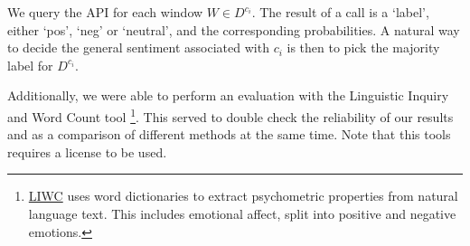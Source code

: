 We query the API for each window $W \in D^{c_i}$. The result of a call is a `label', either `pos', `neg' or `neutral', and the corresponding probabilities. A natural way to decide the general sentiment associated with $c_i$ is then to pick the majority label for $D^{c_i}$.

Additionally, we were able to perform an evaluation with the Linguistic Inquiry and Word Count tool \cite{liwc2015} \footnote{\href{https://liwc.wpengine.com/}{LIWC} uses word dictionaries to extract psychometric properties from natural language text. This includes emotional affect, split into positive and negative emotions.}. This served to double check the reliability of our results and as a comparison of different methods at the same time. Note that this tools requires a license to be used.
